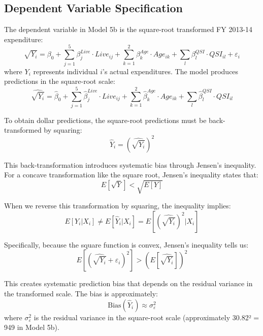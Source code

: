 \subsection{Dependent Variable Specification}

The dependent variable in Model 5b is the square-root transformed FY 2013-14 expenditure:
\begin{equation}
\sqrt{Y_i} = \beta_0 + \sum_{j=1}^{5} \beta_j^{Live} \cdot Live_{ij} + \sum_{k=1}^{2} \beta_k^{Age} \cdot Age_{ik} + \sum_{l} \beta_l^{QSI} \cdot QSI_{il} + \varepsilon_i
\end{equation}
where $Y_i$ represents individual $i$'s actual expenditures. The model produces predictions in the square-root scale:
\begin{equation}
\widehat{\sqrt{Y_i}} = \hat{\beta}_0 + \sum_{j=1}^{5} \hat{\beta}_j^{Live} \cdot Live_{ij} + \sum_{k=1}^{2} \hat{\beta}_k^{Age} \cdot Age_{ik} + \sum_{l} \hat{\beta}_l^{QSI} \cdot QSI_{il}
\end{equation}

To obtain dollar predictions, the square-root predictions must be back-transformed by squaring:
\begin{equation}
\hat{Y}_i = \left(\widehat{\sqrt{Y_i}}\right)^2
\end{equation}

This back-transformation introduces systematic bias through Jensen's inequality. For a concave transformation like the square root, Jensen's inequality states that:
\begin{equation}
E[\sqrt{Y}] < \sqrt{E[Y]}
\end{equation}

When we reverse this transformation by squaring, the inequality implies:
\begin{equation}
E[Y_i | X_i] \neq E[\hat{Y}_i | X_i] = E\left[\left(\widehat{\sqrt{Y_i}}\right)^2 | X_i\right]
\end{equation}

Specifically, because the square function is convex, Jensen's inequality tells us:
\begin{equation}
E\left[\left(\widehat{\sqrt{Y_i}} + \varepsilon_i\right)^2\right] > \left(E\left[\widehat{\sqrt{Y_i}}\right]\right)^2
\end{equation}

This creates systematic prediction bias that depends on the residual variance in the transformed scale. The bias is approximately:
\begin{equation}
\text{Bias}(\hat{Y}_i) \approx \sigma^2_{\varepsilon}
\end{equation}
where $\sigma^2_{\varepsilon}$ is the residual variance in the square-root scale (approximately 30.82² = 949 in Model 5b).

